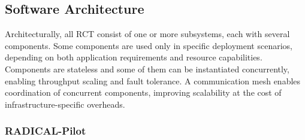 \documentclass[preprint,12pt, a4paper]{elsarticle}
\begin{document}
\subsection{Software Architecture}\label{ssec:architecture}



Architecturally, all RCT consist of one or more subsystems, each with several
components.%
Some components are used only in specific deployment scenarios, depending on
both application requirements and resource capabilities. Components are
stateless and some of them can be instantiated concurrently, 
enabling throughput scaling and fault tolerance. A communication mesh enables
coordination of concurrent components, improving scalability at the cost of
infrastructure-specific overheads.




\subsubsection{RADICAL-Pilot}\label{sssec:arch_rp}
\end{document}
